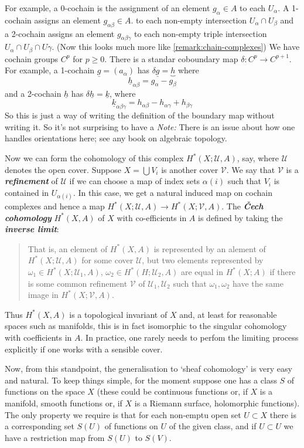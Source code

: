\documentclass{article}
\newcommand{\Uc}{\mathcal{U}}
\newcommand{\Vc}{\mathcal{V}}
\begin{document}
For example, a 0-cochain is the assignment of an element $g_\alpha\in A$ to each $U_\alpha$. A 1-cochain assigns an element $g_{\alpha\beta}\in A$. to each non-empty intersection $U_\alpha\cap U_\beta$ and a 2-cochain assigns an element $g_{\alpha\beta\gamma}$ to each non-empty triple intersection $U_\alpha\cap U_\beta\cap U\gamma$. {\color{cyan}(Now this looks much more like \cref{remark:chain-complexes})} We have cochain groups $C^p$ for $p\geq 0$. There is a standar coboundary map $\delta:C^p\to C^{p+1}$. For example, a 1-cochain $\underline{g}=(a_\alpha)$ has $\delta\underline{g}=\underbrace{h}$ where
\[\underline{h}_{\alpha\beta}=g_\alpha-g_\beta\]
and a 2-cochain $\underline{h}$ has $\delta\underline{h}=\underline{k}$, where
\[\underline{k}_{\alpha\beta\gamma}=h_{\alpha\beta}-h_{\alpha\gamma}+h_{\beta\gamma}\]
{\color{cyan}So this is just a way of writing the definition of the boundary map without writing it. So it's not surprising to have a} \textit{Note:} There is an issue about how one handles orientations here; see any book on algebraic topology.

Now we can form the cohomology of this complex $H^*(X;\Uc,A)$, say, where $\Uc$ denotes the open cover. Suppose $X=\bigcup V_i$ is another cover $\Vc$. We say that $\Vc$ is a \textbf{\textit{refinement}} of $\Uc$ if we can choose a map of index sets $\alpha(i)$ such that $V_i$ is contained in $U_{\alpha(i)}$. In this case, we get a natural induced map on cochain complexes and hence a map $H^*(X;\Uc,A)\to H^*(X;\Vc,A)$. The \textbf{\textit{\v Cech cohomology}} $H^*(X,A)$ of $X$ with co-efficients in $A$ is defined by taking the \textbf{\textit{inverse limit}}:

\begin{quote}
	That is, an element of $H^*(X,A)$ is represented by an alement of $H^*(X;\Uc,A)$ for some cover $\Uc$, but two elements represented by $\omega_1\in H^*(X;\Uc_1,A)$, $\omega_2\in H^*(H;\Uc_2,A)$ are equal in $H^*(X;A)$ if there is some common refinement $\Vc$ of $\Uc_1,\Uc_2$ such that $\omega_1,\omega_2$ have the same image in $H^*(X;\Vc,A)$.
\end{quote}
Thus $H^*(X,A)$ is a topological invariant of $X$ and, at least for reasonable spaces such as manifolds, this is in fact isomorphic to the singular cohomology with coefficients in $A$. In practice, one rarely needs to perfom the limiting process explicitly if one works with a sensible cover.

Now, from this standpoint, the generalisation to ‘sheaf cohomology’ is very easy and natural. To keep things simple, for the moment suppose one has a class $S$ of functions on the space $X$ (these could be continuous functions or, if $X$ is a manifold, smooth functions or, if $X$ is a Riemann surface, holomorphic functions). The only property we require is that for each non-emptu open set $U\subset X$ there is a corresponding set $S(U)$ of functions on $U$ of the given class, and if $U\subset U$ we have a restriction map from $S(U)$ to $S(V)$.
\end{document}
